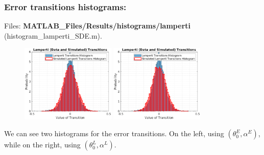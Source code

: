 \documentclass[aspectratio=169]{beamer}\usepackage[utf8]{inputenc}
\begin{document}
\begin{frame}\frametitle{Error transitions histograms:}
Files: \textbf{MATLAB\_Files/Results/histograms/lamperti} (histogram\_lamperti\_SDE.m).\\
\begin{figure}[ht!]
\centering
\includegraphics[width=0.4\textwidth]{../../MATLAB_Files/Results/histograms/lamperti/Optimal.eps}
\includegraphics[width=0.4\textwidth]{../../MATLAB_Files/Results/histograms/lamperti/Optimal_Lamperti.eps}
\end{figure}

We can see two histograms for the error transitions. On the left, using $(\theta_0^E,\alpha^E)$, while on the right, using $(\theta_0^L,\alpha^L)$.

\end{frame}

\end{document}
